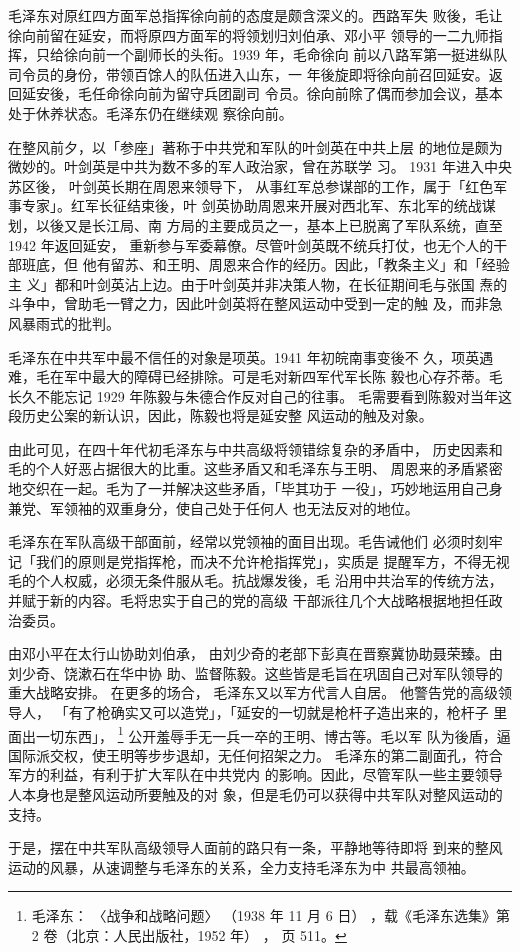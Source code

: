 毛泽东对原红四方面军总指挥徐向前的态度是颇含深义的。西路军失
败後，毛让徐向前留在延安，而将原四方面军的将领划归刘伯承、邓小平
领导的一二九师指挥，只给徐向前一个副师长的头衔。1939 年，毛命徐向
前以八路军第一挺进纵队司令员的身份，带领百馀人的队伍进入山东，一
年後旋即将徐向前召回延安。返回延安後，毛任命徐向前为留守兵团副司
令员。徐向前除了偶而参加会议，基本处于休养状态。毛泽东仍在继续观
察徐向前。

在整风前夕，以「参座」著称于中共党和军队的叶剑英在中共上层
的地位是颇为微妙的。叶剑英是中共为数不多的军人政治家，曾在苏联学
习。
1931 年进入中央苏区後，
叶剑英长期在周恩来领导下，
从事红军总参谋部的工作，属于「红色军事专家」。红军长征结束後，叶
剑英协助周恩来开展对西北军、东北军的统战谋划，以後又是长江局、南
方局的主要成员之一，基本上已脱离了军队系统，直至 1942 年返回延安，
重新参与军委幕僚。尽管叶剑英既不统兵打仗，也无个人的干部班底，但
他有留苏、和王明、周恩来合作的经历。因此，「教条主义」和「经验主
义」都和叶剑英沾上边。由于叶剑英并非决策人物，在长征期间毛与张国
焘的斗争中，曾助毛一臂之力，因此叶剑英将在整风运动中受到一定的触
及，而非急风暴雨式的批判。

毛泽东在中共军中最不信任的对象是项英。1941 年初皖南事变後不
久，项英遇难，毛在军中最大的障碍已经排除。可是毛对新四军代军长陈
毅也心存芥蒂。毛长久不能忘记 1929 年陈毅与朱德合作反对自己的往事。
毛需要看到陈毅对当年这段历史公案的新认识，因此，陈毅也将是延安整
风运动的触及对象。

由此可见，在四十年代初毛泽东与中共高级将领错综复杂的矛盾中，
历史因素和毛的个人好恶占据很大的比重。这些矛盾又和毛泽东与王明、
周恩来的矛盾紧密地交织在一起。毛为了一并解决这些矛盾，「毕其功于
一役」，巧妙地运用自己身兼党、军领袖的双重身分，使自己处于任何人
也无法反对的地位。

毛泽东在军队高级干部面前，经常以党领袖的面目出现。毛告诫他们
必须时刻牢记「我们的原则是党指挥枪，而决不允许枪指挥党」，实质是
提醒军方，不得无视毛的个人权威，必须无条件服从毛。抗战爆发後，毛
沿用中共治军的传统方法，并赋于新的内容。毛将忠实于自己的党的高级
干部派往几个大战略根据地担任政治委员。

由邓小平在太行山协助刘伯承，
由刘少奇的老部下彭真在晋察冀协助聂荣臻。由刘少奇、饶漱石在华中协
助、监督陈毅。这些皆是毛旨在巩固自己对军队领导的重大战略安排。
在更多的场合，
毛泽东又以军方代言人自居。
他警告党的高级领导人，
「有了枪确实又可以造党」，「延安的一切就是枪杆子造出来的，枪杆子
里面出一切东西」，
\footnote{毛泽东：
〈战争和战略问题〉
（1938 年 11 月 6 日）
，载《毛泽东选集》第 2 卷（北京：人民出版社，1952 年）
，
页 511。}
公开羞辱手无一兵一卒的王明、博古等。毛以军
队为後盾，逼国际派交权，使王明等步步退却，无任何招架之力。
毛泽东的第二副面孔，符合军方的利益，有利于扩大军队在中共党内
的影响。因此，尽管军队一些主要领导人本身也是整风运动所要触及的对
象，但是毛仍可以获得中共军队对整风运动的支持。

于是，摆在中共军队高级领导人面前的路只有一条，平静地等待即将
到来的整风运动的风暴，从速调整与毛泽东的关系，全力支持毛泽东为中
共最高领袖。
